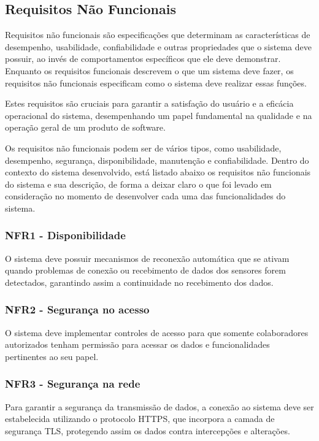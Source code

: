 \subsection[Requisitos Não Funcionais]{Requisitos Não Funcionais}
Requisitos não funcionais são especificações que determinam as características de desempenho, usabilidade, confiabilidade e outras propriedades que o sistema deve possuir, ao invés de comportamentos específicos que ele deve demonstrar. Enquanto os requisitos funcionais descrevem o que um sistema deve fazer, os requisitos não funcionais especificam como o sistema deve realizar essas funções.

Estes requisitos são cruciais para garantir a satisfação do usuário e a eficácia operacional do sistema, desempenhando um papel fundamental na qualidade e na operação geral de um produto de software.

Os requisitos não funcionais podem ser de vários tipos, como usabilidade, desempenho, segurança, disponibilidade, manutenção e confiabilidade. Dentro do contexto do sistema desenvolvido, está listado abaixo os requisitos não funcionais do sistema e sua descrição, de forma a deixar claro o que foi levado em consideração no momento de desenvolver cada uma das funcionalidades do sistema.

\subsubsection{NFR1 - Disponibilidade}
O sistema deve possuir mecanismos de reconexão automática que se ativam quando problemas de conexão ou recebimento de dados dos sensores forem detectados, garantindo assim a continuidade no recebimento dos dados.

\subsubsection{NFR2 - Segurança no acesso}
O sistema deve implementar controles de acesso para que somente colaboradores autorizados tenham permissão para acessar os dados e funcionalidades pertinentes ao seu papel.

\subsubsection{NFR3 - Segurança na rede}
Para garantir a segurança da transmissão de dados, a conexão ao sistema deve ser estabelecida utilizando o protocolo \gls{HTTPS}, que incorpora a camada de segurança \gls{TLS}, protegendo assim os dados contra intercepções e alterações.

